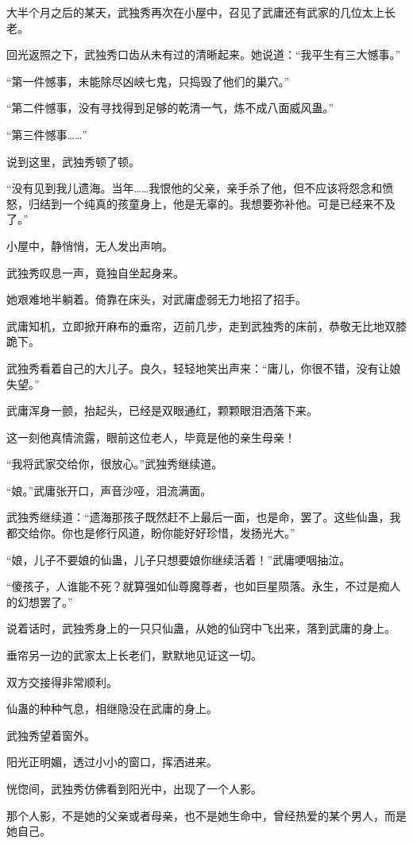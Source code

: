 \begin{this_body}
大半个月之后的某天，武独秀再次在小屋中，召见了武庸还有武家的几位太上长老。

回光返照之下，武独秀口齿从未有过的清晰起来。她说道：“我平生有三大憾事。”

“第一件憾事，未能除尽凶峡七鬼，只捣毁了他们的巢穴。”

“第二件憾事，没有寻找得到足够的乾清一气，炼不成八面威风蛊。”

“第三件憾事……”

说到这里，武独秀顿了顿。

“没有见到我儿遗海。当年……我恨他的父亲，亲手杀了他，但不应该将怨念和愤怒，归结到一个纯真的孩童身上，他是无辜的。我想要弥补他。可是已经来不及了。”

小屋中，静悄悄，无人发出声响。

武独秀叹息一声，竟独自坐起身来。

她艰难地半躺着。倚靠在床头，对武庸虚弱无力地招了招手。

武庸知机，立即掀开麻布的垂帘，迈前几步，走到武独秀的床前，恭敬无比地双膝跪下。

武独秀看着自己的大儿子。良久，轻轻地笑出声来：“庸儿，你很不错，没有让娘失望。”

武庸浑身一颤，抬起头，已经是双眼通红，颗颗眼泪洒落下来。

这一刻他真情流露，眼前这位老人，毕竟是他的亲生母亲！

“我将武家交给你，很放心。”武独秀继续道。

“娘。”武庸张开口，声音沙哑，泪流满面。

武独秀继续道：“遗海那孩子既然赶不上最后一面，也是命，罢了。这些仙蛊，我都交给你。你也是修行风道，盼你能好好珍惜，发扬光大。”

“娘，儿子不要娘的仙蛊，儿子只想要娘你继续活着！”武庸哽咽抽泣。

“傻孩子，人谁能不死？就算强如仙尊魔尊者，也如巨星陨落。永生，不过是痴人的幻想罢了。”

说着话时，武独秀身上的一只只仙蛊，从她的仙窍中飞出来，落到武庸的身上。

垂帘另一边的武家太上长老们，默默地见证这一切。

双方交接得非常顺利。

仙蛊的种种气息，相继隐没在武庸的身上。

武独秀望着窗外。

阳光正明媚，透过小小的窗口，挥洒进来。

恍惚间，武独秀仿佛看到阳光中，出现了一个人影。

那个人影，不是她的父亲或者母亲，也不是她生命中，曾经热爱的某个男人，而是她自己。


\end{this_body}

